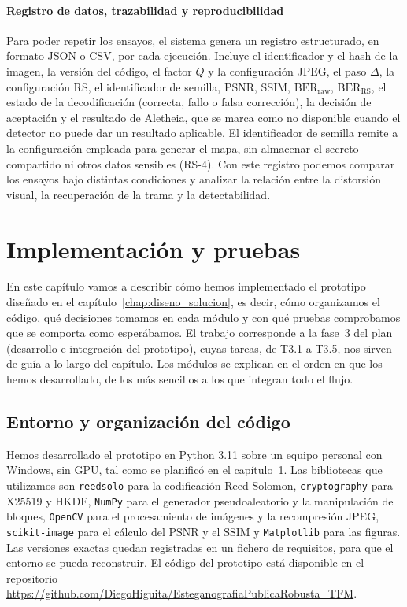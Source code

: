 \documentclass[IB]{TFUOC}%
\begin{document}
\subsubsection{Registro de datos, trazabilidad y reproducibilidad}

Para poder repetir los ensayos, el sistema genera un registro estructurado, en formato JSON o CSV, por cada ejecución. Incluye el identificador y el hash de la imagen, la versión del código, el factor $Q$ y la configuración JPEG, el paso $\Delta$, la configuración RS, el identificador de semilla, $\mathrm{PSNR}$, $\mathrm{SSIM}$, $\mathrm{BER}_{\mathrm{raw}}$, $\mathrm{BER}_{\mathrm{RS}}$, el estado de la decodificación (correcta, fallo o falsa corrección), la decisión de aceptación y el resultado de Aletheia, que se marca como no disponible cuando el detector no puede dar un resultado aplicable. El identificador de semilla remite a la configuración empleada para generar el mapa, sin almacenar el secreto compartido ni otros datos sensibles (RS-4). Con este registro podemos comparar los ensayos bajo distintas condiciones y analizar la relación entre la distorsión visual, la recuperación de la trama y la detectabilidad.


 
\chapter{Implementación y pruebas}
\label{chap:implementacion}

En este capítulo vamos a describir cómo hemos implementado el prototipo diseñado en el capítulo~\ref{chap:diseno_solucion}, es decir, cómo organizamos el código, qué decisiones tomamos en cada módulo 
y con qué pruebas comprobamos que se comporta como esperábamos. El trabajo corresponde a la fase~3 del plan (desarrollo e integración del prototipo), cuyas tareas, de T3.1 a T3.5, nos sirven de guía a lo largo del capítulo. Los módulos se explican en el orden en que los hemos desarrollado, de los más sencillos a los que integran todo el flujo.

\section{Entorno y organización del código}
\label{sec:entorno_codigo}

Hemos desarrollado el prototipo en Python 3.11 sobre un equipo personal con Windows, sin GPU, tal como se planificó en el capítulo~1. Las bibliotecas que utilizamos son \texttt{reedsolo} para la codificación Reed-Solomon, \texttt{cryptography} para X25519 y HKDF, \texttt{NumPy} para el generador pseudoaleatorio y la manipulación de bloques, \texttt{OpenCV} para el procesamiento de imágenes y la recompresión JPEG, \texttt{scikit-image} para el cálculo del $\mathrm{PSNR}$ y el $\mathrm{SSIM}$ y \texttt{Matplotlib} para las figuras. Las versiones exactas quedan registradas en un fichero de requisitos, para que el entorno se pueda reconstruir. El código del prototipo está disponible en el 
repositorio \url{https://github.com/DiegoHiguita/EsteganografiaPublicaRobusta_TFM}.
\end{document}
